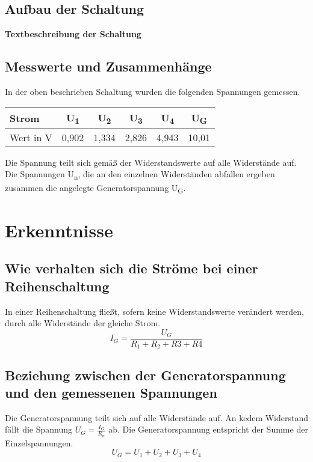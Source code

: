 \documentclass[
a4paper,     %
12pt         %
]{scrartcl}  %
\begin{document}
\subsection{Aufbau der Schaltung}

\textbf{Textbeschreibung der Schaltung}

\subsection{Messwerte und Zusammenhänge}
In der oben beschrieben Schaltung wurden die folgenden Spannungen gemessen.
\begin{center}
  \begin{tabular}{ l | c | c | c | c | c}
    \hline
    Strom      & U\textsubscript{1} & U\textsubscript{2} & U\textsubscript{3} & U\textsubscript{4} & U\textsubscript{G} \\ \hline
    Wert in V  & 0,902 & 1,334 & 2,826 & 4,943 & 10,01 \\
    \hline
  \end{tabular}
\end{center}
Die Spannung teilt sich gemäß der Widerstandswerte auf alle Widerstände auf. Die Spannungen U\textsubscript{n}, die an den einzelnen Widerständen abfallen ergeben zusammen die angelegte Generatorspannung U\textsubscript{G}.

\section{Erkenntnisse}

\subsection{Wie verhalten sich die Ströme bei einer Reihenschaltung}
In einer Reihenschaltung fließt, sofern keine Widerstandswerte verändert werden, durch alle Widerstände der gleiche Strom.\\
\[I_{G}=\frac{U_{G}}{R_{1}+R_{2}+R{3}+R{4}}\]

\subsection{Beziehung zwischen der Generatorspannung und den gemessenen Spannungen}
Die Generatorspannung teilt sich auf alle Widerstände auf. An kedem Widerstand fällt die Spannung $U_{G}=\frac{I_{G}}{R_{n}} $ ab. Die Generatorspannung entspricht der Summe der Einzelspannungen.
\[U_{G}=U_{1}+U_{2}+U_{3}+U_{4}\]
\end{document}
